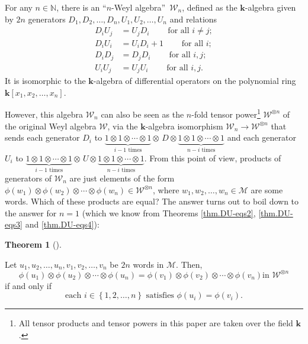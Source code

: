 \documentclass[numbers=enddot,12pt,final,onecolumn,notitlepage]{scrartcl}%
\theoremstyle{definition}
\newtheorem{theo}{Theorem}[section]
\newenvironment{theorem}[1][]
{\begin{theo}[#1]\begin{leftbar}}
{\end{leftbar}\end{theo}}
\newcommand{\W}{\mathcal{W}}
\newcommand{\M}{\mathcal{M}}
\newcommand{\kk}{\mathbf{k}}
\newcommand{\NN}{\mathbb{N}}
\begin{document}
For any $n\in\NN$, there is an \textquotedblleft$n$-Weyl
algebra\textquotedblright\ $\W_n$, defined as the $\kk$-algebra given by $2n$ generators
$D_{1},D_{2},\ldots,D_{n},U_{1},U_{2},\ldots,U_{n}$ and relations%
\begin{align*}
D_{i}U_{j}  &  =U_{j}D_{i}\ \ \ \ \ \ \ \ \ \ \text{for all }i\neq j;\\
D_{i}U_{i}  &  =U_{i}D_{i}+1\ \ \ \ \ \ \ \ \ \ \text{for all }i;\\
D_{i}D_{j}  &  =D_{j}D_{i}\ \ \ \ \ \ \ \ \ \ \text{for all }i,j;\\
U_{i}U_{j}  &  =U_{j}U_{i}\ \ \ \ \ \ \ \ \ \ \text{for all }i,j.
\end{align*}
It is isomorphic to the $\kk$-algebra of differential
operators on the polynomial ring $\kk\left[  x_{1},x_{2},\ldots
,x_{n}\right]  $.

However, this algebra $\W_n$ can also be seen as the $n$-fold
tensor power\footnote{All tensor products and tensor powers
in this paper are taken over the field $\kk$.} $\W^{\otimes n}$ of the original Weyl algebra
$\W$, via the $\kk$-algebra isomorphism
$\W_n \to \W^{\otimes n}$ that sends each generator $D_{i}$ to
$\underbrace{1\otimes1\otimes\cdots\otimes1}_{i-1\text{ times}}\otimes
\,D\otimes\underbrace{1\otimes1\otimes\cdots\otimes1}_{n-i\text{ times}}$ and
each generator $U_{i}$ to $\underbrace{1\otimes1\otimes\cdots\otimes
1}_{i-1\text{ times}}\otimes\,U\otimes\underbrace{1\otimes1\otimes
\cdots\otimes1}_{n-i\text{ times}}$. From this point of view, products of
generators of $\W_{n}$ are just elements of the form $\phi\left(
w_{1}\right)  \otimes\phi\left(  w_{2}\right)  \otimes\cdots\otimes\phi\left(
w_{n}\right)  \in\W^{\otimes n}$, where $w_{1},w_{2},\ldots,w_{n}%
\in\M$ are some words. Which of these products are equal? The answer
turns out to boil down to the answer for $n=1$ (which we know from Theorems
\ref{thm.DU-eqs2}, \ref{thm.DU-eqs3} and \ref{thm.DU-eqs4}):

\begin{theorem}
\label{thm.Wn.reduce}Let $u_{1},u_{2},\ldots,u_{n},v_{1},v_{2},\ldots,v_{n}$
be $2n$ words in $\M$. Then,%
\[
\phi\left(  u_{1}\right)  \otimes\phi\left(  u_{2}\right)  \otimes
\cdots\otimes\phi\left(  u_{n}\right)  =\phi\left(  v_{1}\right)  \otimes
\phi\left(  v_{2}\right)  \otimes\cdots\otimes\phi\left(  v_{n}\right)  \text{
in }\W^{\otimes n}
\]
if and only if
\[
\text{each }i\in\left\{  1,2,\ldots,n\right\}  \text{ satisfies }\phi\left(
u_{i}\right)  =\phi\left(  v_{i}\right)  .
\]

\end{theorem}
\end{document}
